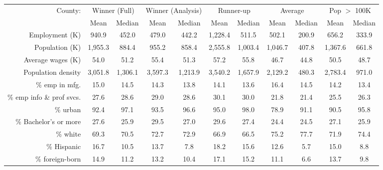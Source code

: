 \begin{tabular}{r*{5}{c}*{5}{c}} \toprule 
County:             &\multicolumn{2}{c}{Winner (Full)}&\multicolumn{2}{c}{Winner (Analysis)}&\multicolumn{2}{c}{Runner-up}&\multicolumn{2}{c}{Average}&\multicolumn{2}{c}{Pop $ >$ 100K }\\\cline{2-11}
                    &        Mean&      Median&        Mean&      Median&        Mean&      Median&        Mean&      Median&        Mean&      Median\\
\midrule
Employment (K)      &       940.9&       452.0&       479.0&       442.2&     1,228.4&       511.5&       502.1&       200.9&       656.2&       333.9\\
Population (K)      &     1,955.3&       884.4&       955.2&       858.4&     2,555.8&     1,003.4&     1,046.7&       407.8&     1,367.6&       661.8\\
Average wages (K)   &        54.0&        51.2&        55.4&        51.3&        57.2&        55.8&        46.7&        44.8&        50.5&        48.7\\
Population density  &     3,051.8&     1,306.1&     3,597.3&     1,213.9&     3,540.2&     1,657.9&     2,129.2&       480.3&     2,783.4&       971.0\\
\% emp in mfg.      &        15.0&        14.5&        14.3&        13.8&        14.1&        13.6&        16.4&        14.5&        14.2&        13.4\\
\% emp info \& prof svcs.&        27.6&        28.6&        29.0&        28.6&        30.1&        30.0&        21.8&        21.4&        25.5&        26.3\\
\% urban            &        92.4&        97.1&        93.5&        96.6&        95.0&        98.0&        78.9&        91.1&        90.5&        95.8\\
\% Bachelor's or more&        27.6&        25.9&        29.5&        27.0&        29.6&        27.4&        24.4&        24.5&        27.1&        25.9\\
\% white            &        69.3&        70.5&        72.7&        72.9&        66.9&        66.5&        75.2&        77.7&        71.9&        74.4\\
\% Hispanic         &        16.7&        10.5&        13.7&         7.8&        18.2&        15.6&        12.6&         5.7&        15.0&         8.8\\
\% foreign-born     &        14.9&        11.2&        13.2&        10.4&        17.1&        15.2&        11.1&         6.6&        13.7&         9.8\\

\end{tabular}
